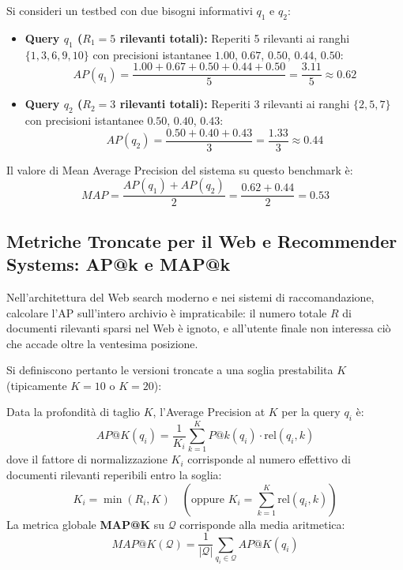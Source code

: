 \begin{example}
Si consideri un testbed con due bisogni informativi $q_1$ e $q_2$:
\begin{itemize}
    \item \textbf{Query $q_1$ ($R_1 = 5$ rilevanti totali):} Reperiti 5 rilevanti ai ranghi $\{1, 3, 6, 9, 10\}$ con precisioni istantanee $1.00$, $0.67$, $0.50$, $0.44$, $0.50$:
    \begin{equation}
    AP(q_1) = \frac{1.00 + 0.67 + 0.50 + 0.44 + 0.50}{5} = \frac{3.11}{5} \approx \mathbf{0.62}
    \end{equation}
    \item \textbf{Query $q_2$ ($R_2 = 3$ rilevanti totali):} Reperiti 3 rilevanti ai ranghi $\{2, 5, 7\}$ con precisioni istantanee $0.50$, $0.40$, $0.43$:
    \begin{equation}
    AP(q_2) = \frac{0.50 + 0.40 + 0.43}{3} = \frac{1.33}{3} \approx \mathbf{0.44}
    \end{equation}
\end{itemize}
Il valore di Mean Average Precision del sistema su questo benchmark \`e:
\begin{equation}
MAP = \frac{AP(q_1) + AP(q_2)}{2} = \frac{0.62 + 0.44}{2} = \mathbf{0.53}
\end{equation}
\end{example}

\FloatBarrier
\subsection{Metriche Troncate per il Web e Recommender Systems: AP@k e MAP@k}
\label{subsec:ap-map-at-k}

Nell'architettura del Web search moderno e nei sistemi di raccomandazione, calcolare l'AP sull'intero archivio \`e impraticabile: il numero totale $R$ di documenti rilevanti sparsi nel Web \`e ignoto, e all'utente finale non interessa ciò che accade oltre la ventesima posizione.

Si definiscono pertanto le versioni troncate a una soglia prestabilita $K$ (tipicamente $K=10$ o $K=20$):

\begin{definition}[AP@K e MAP@K]
Data la profondit\`a di taglio $K$, l'Average Precision at $K$ per la query $q_i$ \`e:
\begin{equation}
AP@K(q_i) = \frac{1}{K_i} \sum_{k=1}^K P@k(q_i) \cdot \mathrm{rel}(q_i, k)
\end{equation}
dove il fattore di normalizzazione $K_i$ corrisponde al numero effettivo di documenti rilevanti reperibili entro la soglia:
\begin{equation}
K_i = \min(R_i, K) \quad \left(\text{oppure } K_i = \sum_{k=1}^K \mathrm{rel}(q_i, k)\right)
\end{equation}
La metrica globale \textbf{MAP@K} su $\mathcal{Q}$ corrisponde alla media aritmetica:
\begin{equation}
MAP@K(\mathcal{Q}) = \frac{1}{|\mathcal{Q}|} \sum_{q_i \in \mathcal{Q}} AP@K(q_i)
\end{equation}
\end{definition}


